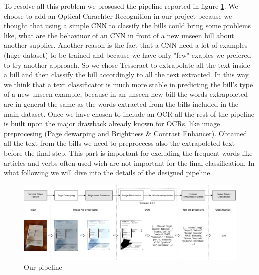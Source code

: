 \documentclass[10pt,twocolumn,letterpaper]{article}
\begin{document}
To resolve all this problem we prososed the pipeline reported in figure \ref{fig:pipeline}. We choose to add an Optical Carachter Recognition in our project because we thought that using a simple CNN to classify the bills could bring some problems like, what are the behaviuor of an CNN in front of a new unseen bill about another supplier. Another reason is the fact that a CNN need a lot of examples (huge dataset) to be trained and because we have only "few" exaples we prefered to try another approach. So we chose Tesseract to extrapolate all the text inside a bill and then classify the bill accordingly to all the text extracted. In this way we think that a text classificator is much more stable in predicting the bill's type of a new unseen example, because in an unseen new bill the words extrapoleted are in general the same as the words extracted from the bills included in the main dataset. Once we have chosen to include an OCR all the rest of the pipeline is built upon the major drawback already known for OCRs, like image preprocesing (Page dewarping and Brightness \& Contrast Enhancer). Obtained all the text from the bills we need to preproccess also the extrapoleted text before the final step. This part is important for excluding the frequent words like articles and verbs often used wich are not important for the final classification. In what following we will dive into the details of the designed pipeline.

\begin{figure}[h]
  \centering
  \includegraphics[width=1.0\textwidth]{images/pipeline.png}
  \caption{Our pipeline}
  \label{fig:pipeline}
\end{figure}
\end{document}
